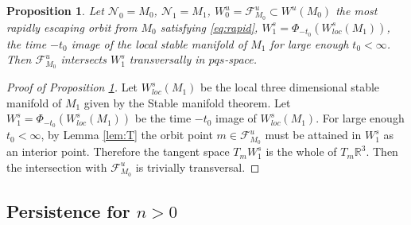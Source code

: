 \documentclass[a4paper,11pt]{article}
\newtheorem{proposition}{Proposition}[section]
\theoremstyle{remark}
\begin{document}
\begin{proposition} \label{prop:singular}
 Let $\mathcal{N}_0=M_0$, $\mathcal{N}_1=M_1$, $W^u_0=\mathcal{F}^u_{M_0}\subset W^u(M_0)$ the most rapidly escaping orbit from $M_0$ satisfying \eqref{eq:rapid}, $W^s_1=\Phi_{-t_0}(W^s_{loc}(M_1))$, the time $-t_0$ image of the local stable manifold of $M_1$ for large enough $t_0<\infty$. Then $\mathcal{F}^u_{M_0}$ intersects $W^s_1$ transversally in $pqs$-space.
\end{proposition}
\begin{proof}[Proof of Proposition \ref{prop:singular}]
%
 Let $W^s_{loc}(M_1)$ be the local three dimensional stable manifold of $M_1$ given by the Stable manifold theorem. Let $W^s_1=\Phi_{-t_0}(W^s_{loc}(M_1))$ be the time $-t_0$ image of $W^s_{loc}(M_1)$. For large enough $t_0<\infty$, by Lemma \ref{lem:T} the orbit point $m\in \mathcal{F}^u_{M_0}$ must be attained in $W^s_1$ as an interior point. Therefore the tangent space ${T}_m W^s_1$ is the whole of ${T}_m \mathbb{R}^3$. Then the intersection with $\mathcal{F}^u_{M_0}$ is trivially transversal.
\end{proof}

\subsection{Persistence for $n>0$} \label{sec:thmproof}
\end{document}
